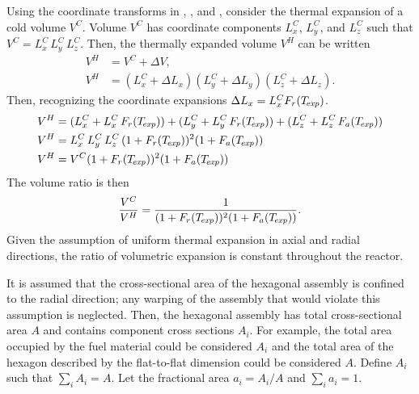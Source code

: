     Using the coordinate transforms in , , 
    and , consider the thermal expansion of a cold volume 
    $V^C$.  Volume $V^C$ has coordinate components $L_x^C$, $L_y^C$, and $L_z^C$
    such that ${V^C = L_x^C \, L_y^C \, L_z^C}$. Then, the thermally expanded 
    volume $V^H$ can be written
    \begin{align}
      V^H &= V^C + \Delta V, \\
      V^H &= (L_x^C + \Delta L_x) (L_y^C + \Delta L_y) (L_z^C + \Delta L_z). 
    \end{align}
    Then, recognizing the coordinate expansions 
    ${\Delta L_x = L_x^C F_r(T_{\!\mbox{\scriptsize \em exp}})}$.
    \begin{align}
      V^H &= (L_x^C + L_x^C \, F_r(T_{\!\mbox{\scriptsize \em exp}})) + (L_y^C + L_y^C \, F_r(T_{\!\mbox{\scriptsize \em exp}})) + 
        (L_z^C + L_z^C \, F_a(T_{\!\mbox{\scriptsize \em exp}})) \\
      V^H &= L_x^C \, L_y^C \, L_z^C \, (1 + F_r(T_{\!\mbox{\scriptsize \em exp}}))^2 (1+F_a(T_{\!\mbox{\scriptsize \em exp}})) \\
      V^H &= V^C (1 + F_r(T_{\!\mbox{\scriptsize \em exp}}))^2 (1+F_a(T_{\!\mbox{\scriptsize \em exp}}))
    \end{align}
    The volume ratio is then
    \begin{equation}
      \label{eq:volume_ratio}
      \frac{V^C}{V^H} = \frac{1}{(1+F_r(T_{\!\mbox{\scriptsize \em exp}}))^2 (1+F_a(T_{\!\mbox{\scriptsize \em exp}}))}.
    \end{equation}
    Given the assumption of uniform thermal expansion in axial and radial
    directions, the ratio of volumetric expansion is constant throughout the
    reactor.

    It is assumed that the cross-sectional area of the hexagonal assembly is 
    confined to the radial direction; any warping of the assembly that would
    violate this assumption is neglected. Then, the hexagonal assembly has total
    cross-sectional area $A$ and contains component cross sections $A_i$. For
    example, the total area occupied by the fuel material could be considered
    $A_i$ and the total area of the hexagon described by the flat-to-flat
    dimension could be considered $A$. Define $A_i$ such that 
    $\sum_{i} A_i = A$. Let the fractional area $a_i = A_i/A$ and 
    $\sum_{i} a_i = 1$.

